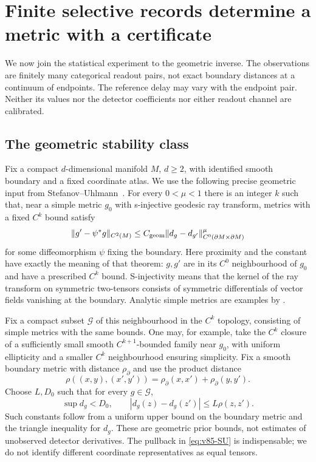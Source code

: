 \section{Finite selective records determine a metric with a certificate}
\label{sec:v85-finite-geometry}
We now join the statistical experiment to the geometric inverse. The
observations are finitely many categorical readout pairs, not exact
boundary distances at a continuum of endpoints. The reference delay
may vary with the endpoint pair. Neither its values nor the detector
coefficients nor either readout channel are calibrated.

\subsection{The geometric stability class}
Fix a compact $d$-dimensional manifold $M$, $d\ge2$, with identified
smooth boundary and a fixed coordinate atlas. We use the following
precise geometric input from Stefanov--Uhlmann~\cite[Theorem 5]{V85SU}.
For every $0<\mu<1$ there is an integer $k$ such that, near a simple
metric $g_0$ with s-injective geodesic ray transform, metrics with a
fixed $C^k$ bound satisfy
\begin{equation}\label{eq:v85-SU}
 \|g'-\psi^*g\|_{C^2(M)}
       \le C_{\rm geom}\|d_g-d_{g'}\|_{C^0(\partial M\times\partial M)}^\mu
\end{equation}
for some diffeomorphism $\psi$ fixing the boundary. Here proximity and
the constant have exactly the meaning of that theorem: $g,g'$ are in
its $C^0$ neighbourhood of $g_0$ and have a prescribed $C^k$ bound.
S-injectivity means that the kernel of the ray transform on symmetric
two-tensors consists of symmetric differentials of vector fields
vanishing at the boundary. Analytic simple metrics are examples by
\cite[Theorem 1]{V85SU}.

Fix a compact subset $\mathcal G$ of this neighbourhood in the $C^k$
topology, consisting of simple metrics with the same bounds. One may,
for example, take the $C^k$ closure of a sufficiently small smooth
$C^{k+1}$-bounded family near $g_0$, with uniform ellipticity and a
smaller $C^k$ neighbourhood ensuring simplicity. Fix a smooth boundary
metric with distance $\rho_\partial$ and use the product distance
\[
 \rho((x,y),(x',y'))=\rho_\partial(x,x')+\rho_\partial(y,y').
\]
Choose $L,D_0$ such that for every $g\in\mathcal G$,
\begin{equation}\label{eq:v85-distance-bounds}
 \sup d_g<D_0,\qquad
 |d_g(z)-d_g(z')|\le L\rho(z,z').
\end{equation}
Such constants follow from a uniform upper bound on the boundary
metric and the triangle inequality for $d_g$. These are geometric
prior bounds, not estimates of unobserved detector derivatives.
The pullback in \eqref{eq:v85-SU} is indispensable; we do not identify
different coordinate representatives as equal tensors.

